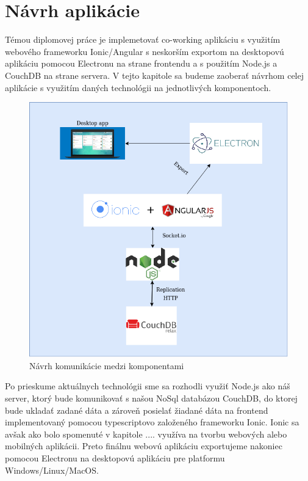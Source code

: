 \section{Návrh aplikácie}
\indent Témou diplomovej práce je implemetovať co-working aplikáciu s využitím webového frameworku Ionic/Angular s neskorším exportom na desktopovú aplikáciu pomocou Electronu na strane frontendu a s použitím Node.js a CouchDB na strane servera. V tejto kapitole sa budeme zaoberať návrhom celej aplikácie s využitím daných technológii na jednotlivých komponentoch. 

\begin{figure}[H]
    \centering
    \includegraphics[scale=0.60]{img/diagram.png}
    \caption{Návrh komunikácie medzi komponentami}
    \label{fig:diagram}
\end{figure}

\indent Po prieskume aktuálnych technológii sme sa rozhodli využiť Node.js ako náš server, ktorý bude komunikovať s našou NoSql databázou CouchDB, do ktorej bude ukladať zadané dáta a zároveň posielať žiadané dáta na frontend implementovaný pomocou typescriptovo založeného frameworku Ionic. Ionic sa avšak ako bolo spomenuté v kapitole .... využíva na tvorbu webových alebo mobilných aplikácii. Preto finálnu webovú aplikáciu exportujeme nakoniec pomocou Electronu na desktopovú aplikáciu pre platformu Windows/Linux/MacOS.

